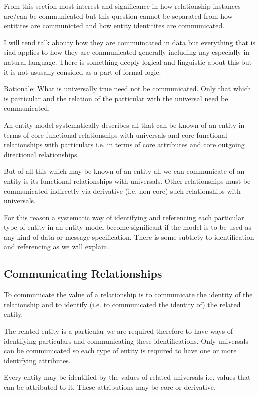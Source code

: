 \mynote From this section most interest and significance  in how relationship instances are/can be communicated but this question cannot be separated from how entitites are communicted and how entity identitites are communicated.

\mynote I will tend talk abouty how they are commuincated in data but everything that is siad applies to how they are communicated generally including nay especially in natural language. There is something deeply logical and linguistic about this but it is not ususally consided as a part of formal logic.

\mynote Rationale: What is universally true need not be communicated. Only that which is particular and the relation of the particular with the universal need be communicated. 

\mynote An entity model systematically describes all that can be known of an entity
in terms of core functional relationships with universals and core functional relationships with particulars i.e. in terms of core attributes and core outgoing directional relationships.

\mynote But of all this which  may be known of an entity all we can communicate of an entity is its functional relationships with universals. Other relationships must be communicated indirectly via derivative (i.e. non-core) such relationships with universals. 

\mynote For this reason a systematic way of identifying and referencing each particular type  of entity in an entity model become significant if the model is to be used as any kind of data or message specification. There is some subtlety to identification and referencing as we will explain.

\subsection*{Communicating Relationships}
\mynote To communicate the value of a relationship is to communicate the identity of the relationship and  to identify (i.e. to communicated the identity of) the related entity. 

\mynote The related entity is a particular we are required therefore to have ways of identifying particulars and communicating these identifications.  
Only universals can be communicated so each type of entity is required 
to have one or more identifying attributes. 

\mynote Every entity may be identified by the values of related universals i.e. values that can be attributed to it. These attributions  may be core or derivative.

